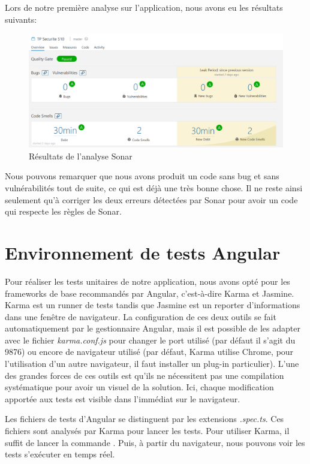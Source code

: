 \documentclass{polytech/polytech}
\begin{document}
Lors de notre première analyse sur l'application, nous avons eu les résultats suivants: 

\begin{figure}
	\includegraphics[scale=0.55]{sonarresult.png}
	\caption{Résultats de l'analyse Sonar}
	\label{fig:sonarresult}
\end{figure}

Nous pouvons remarquer que nous avons produit un code sans bug et sans vulnérabilités tout de suite, ce qui est déjà une très bonne chose. Il ne reste ainsi seulement qu'à corriger les deux erreurs détectées par Sonar pour avoir un code qui respecte les règles de Sonar. 


\chapter{Environnement de tests Angular}


Pour réaliser les tests unitaires de notre application, nous avons opté pour les frameworks de base recommandés par Angular, c'est-à-dire Karma et Jasmine. Karma est un runner de tests tandis que Jasmine est un reporter d'informations dans une fenêtre de navigateur. La configuration de ces deux outils se fait automatiquement par le gestionnaire Angular, mais il est possible de les adapter avec le fichier \textit{karma.conf.js} pour changer le port utilisé (par défaut il s'agit du 9876) ou encore de navigateur utilisé (par défaut, Karma utilise Chrome, pour l'utilisation d'un autre navigateur, il faut installer un plug-in particulier). L'une des grandes forces de ces outils est qu'ils ne nécessitent pas une compilation systématique pour avoir un visuel de la solution. Ici, chaque modification apportée aux tests est visible dans l'immédiat sur le navigateur. 

Les fichiers de tests d'Angular se distinguent par les extensions \textit{.spec.ts}. Ces fichiers sont analysés par Karma pour lancer les tests. Pour utiliser Karma, il suffit de lancer la commande . Puis, à partir du navigateur, nous pouvons voir les tests s'exécuter en temps réel. 
\end{document}
